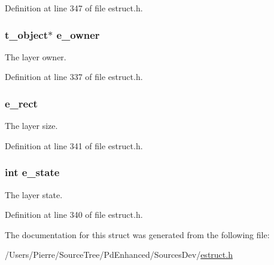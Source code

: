 Definition at line 347 of file estruct.\-h.

\hypertarget{struct__elayer_a2a35e154dc0053b0c8078d322ee1b5e3}{
\subsubsection[{e\-\_\-owner}]{\setlength{\rightskip}{0pt plus 5cm}t\-\_\-object$\ast$ e\-\_\-owner}}\label{struct__elayer_a2a35e154dc0053b0c8078d322ee1b5e3}
The layer owner. 

Definition at line 337 of file estruct.\-h.

\hypertarget{struct__elayer_aaef55281ce06e8d04077acd1e73e484e}{
\subsubsection[{e\-\_\-rect}]{ e\-\_\-rect}}\label{struct__elayer_aaef55281ce06e8d04077acd1e73e484e}
The layer size. 

Definition at line 341 of file estruct.\-h.

\hypertarget{struct__elayer_a6ebb09ffbaedff41ff95d74f7ebdb71b}{
\subsubsection[{e\-\_\-state}]{\setlength{\rightskip}{0pt plus 5cm}int e\-\_\-state}}\label{struct__elayer_a6ebb09ffbaedff41ff95d74f7ebdb71b}
The layer state. 

Definition at line 340 of file estruct.\-h.



The documentation for this struct was generated from the following file\-:\begin{DoxyCompactItemize}
\item 
/\-Users/\-Pierre/\-Source\-Tree/\-Pd\-Enhanced/\-Sources\-Dev/\hyperlink{estruct_8h}{estruct.\-h}\end{DoxyCompactItemize}
